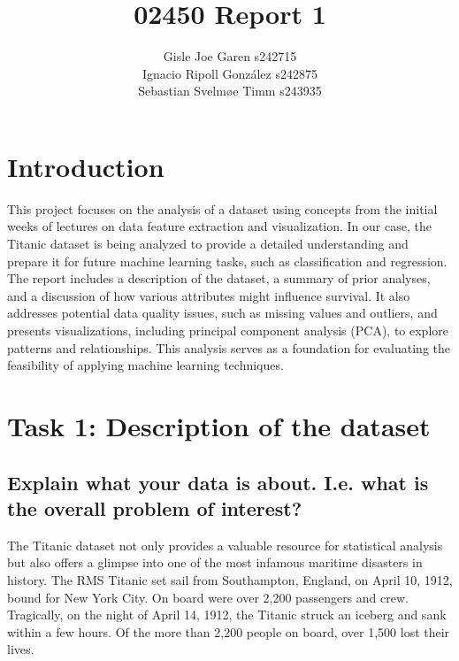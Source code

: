 \documentclass[twoside,11pt]{article}
\begin{document}
\title{02450 Report 1}

\author{
	\name Gisle Joe Garen \email s242715 \\
	\AND
	\name Ignacio Ripoll González \email s242875 \\
	\AND
	\name Sebastian Svelmøe Timm \email s243935 \\
}


\maketitle

\section{Introduction}

This project focuses on the analysis of a dataset using concepts from the initial weeks of lectures on data feature extraction and visualization. In our case, the Titanic dataset is being analyzed to provide a detailed understanding and prepare it for future machine learning tasks, such as classification and regression. The report includes a description of the dataset, a summary of prior analyses, and a discussion of how various attributes might influence survival. It also addresses potential data quality issues, such as missing values and outliers, and presents visualizations, including principal component analysis (PCA), to explore patterns and relationships. This analysis serves as a foundation for evaluating the feasibility of applying machine learning techniques.

\section*{Task 1: Description of the dataset}
\subsection*{Explain what your data is about. I.e. what is the overall problem of interest?}
The Titanic dataset not only provides a valuable resource for statistical analysis but also offers a glimpse into one of the most infamous maritime disasters in history. The RMS Titanic set sail from Southampton, England, on April 10, 1912, bound for New York City. On board were over 2,200 passengers and crew. Tragically, on the night of April 14, 1912, the Titanic struck an iceberg and sank within a few hours. Of the more than 2,200 people on board, over 1,500 lost their lives.
\end{document}
